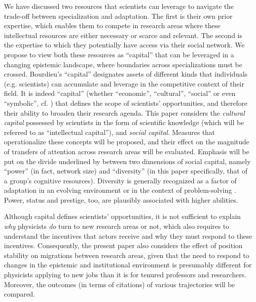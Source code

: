 \documentclass{article}
\begin{document}
We have discussed two resources that scientists can leverage to navigate the trade-off between specialization and adaptation. The first is their own prior expertise, which enables them to compete in research areas where these intellectual resources are either necessary or scarce and relevant. The second is the expertise to which they potentially have access via their social network. We propose to view both these resources as ``capital'' \citep{Bourdieu1986} that can be leveraged in a changing epistemic landscape, where boundaries across specializations must be crossed. Bourdieu's ``capital'' designates assets of different kinds that individuals (e.g. scientists) can accumulate and leverage in the competitive context of their field. It is indeed ``capital''  (whether ``economic'', ``cultural'', ``social'' or even ``symbolic'', cf. \citealt{Bourdieu1986}) that defines the scope of scientists' opportunities, and therefore their ability to broaden their research agenda. This paper considers the \textit{cultural capital} possessed by scientists in the form of scientific knowledge (which will be referred to as ``intellectual capital''), and \textit{social capital}. Measures that operationalize these concepts will be proposed, and their effect on the magnitude of transfers of attention across research areas will be evaluated. Emphasis will be put on the divide underlined by \citet{Abbasi2014} between two dimensions of social capital, namely ``power'' (in fact, network size) and ``diversity'' (in this paper specifically, that of a group's cognitive resources). Diversity is generally recognized as a factor of adaptation in an evolving environment \citep{Schimmelpfennig2021,Muthukrishna2016,Henrich2004} or in the context of problem-solving \citep{Hong2004}. Power, status and prestige, too, are plausibly associated with higher abilities.

Although capital defines scientists' opportunities, it is not sufficient to explain \textit{why} physicists \textit{do} turn to new research areas or not, which also requires to understand the incentives that actors receive and why they must respond to these incentives. Consequently, the present paper also considers the effect of position stability on migrations between research areas, given that the need to respond to changes in the epistemic and institutional environment is presumably different for physicists applying to new jobs than it is for tenured professors and researchers. Moreover, the outcomes (in terms of citations) of various trajectories will be compared.
\end{document}
